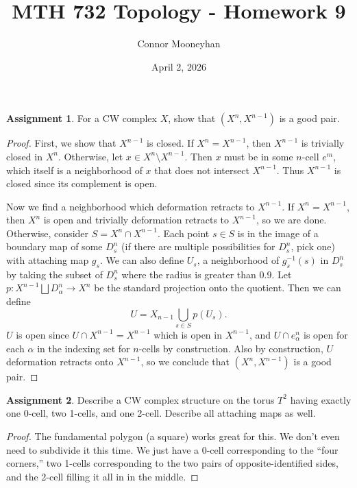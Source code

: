 \documentclass[12pt]{article}
\title{MTH 732 Topology - Homework 9}
\author{Connor Mooneyhan}
\date{April 2, 2026}
\theoremstyle{definition}
\newtheorem{ex}{Assignment}
\begin{document}
\maketitle

\begin{ex}
	For a CW complex $X$, show that $(X^n, X^{n-1})$ is a good pair.
\end{ex}
\begin{proof}
	First, we show that $X^{n-1}$ is closed.
	If $X^n = X^{n-1}$, then $X^{n-1}$ is trivially closed in $X^n$.
	Otherwise, let $x \in X^n \setminus X^{n-1}$.
	Then $x$ must be in some $n$-cell $e^m$, which itself is a neighborhood of $x$ that does not intersect $X^{n-1}$.
	Thus $X^{n-1}$ is closed since its complement is open.

	Now we find a neighborhood which deformation retracts to $X^{n-1}$.
	If $X^n = X^{n-1}$, then $X^n$ is open and trivially deformation retracts to $X^{n-1}$, so we are done.
	Otherwise, consider $S = X^n \cap X^{n-1}$.
	Each point $s \in S$ is in the image of a boundary map of some $D^n_s$ (if there are multiple possibilities for $D^n_s$, pick one) with attaching map $g_s$.
	We can also define $U_s$, a neighborhood of $g_s^{-1}(s)$ in $D^n_s$ by taking the subset of $D^n_s$ where the radius is greater than 0.9.
	Let $p : X^{n-1} \bigsqcup D^n_\alpha \to X^{n}$ be the standard projection onto the quotient.
	Then we can define \begin{equation*}
		U = X_{n-1} \bigcup_{s \in S} p(U_s).
	\end{equation*}
	$U$ is open since $U \cap X^{n-1} = X^{n-1}$ which is open in $X^{n-1}$, and $U \cap e^n_\alpha$ is open for each $\alpha$ in the indexing set for $n$-cells by construction.
	Also by construction, $U$ deformation retracts onto $X^{n-1}$, so we conclude that $(X^n, X^{n-1})$ is a good pair.
\end{proof}

\begin{ex}
	Describe a CW complex structure on the torus $T^2$ having exactly one 0-cell, two 1-cells, and one 2-cell.
	Describe all attaching maps as well.
\end{ex}
\begin{proof}
	The fundamental polygon (a square) works great for this.
	We don't even need to subdivide it this time.
	We just have a 0-cell corresponding to the ``four corners,'' two 1-cells corresponding to the two pairs of opposite-identified sides, and the 2-cell filling it all in in the middle.
\end{proof}
\end{document}
